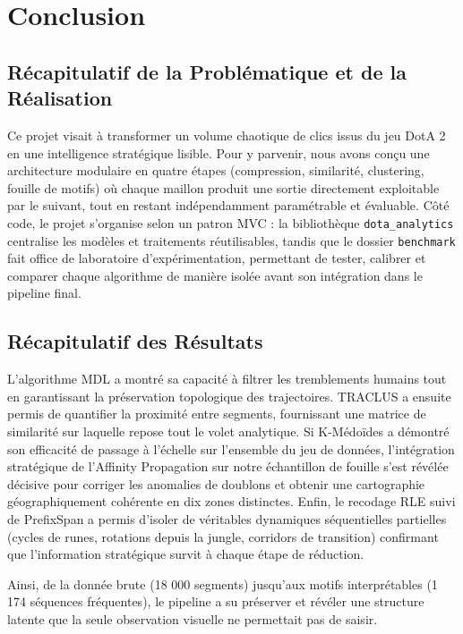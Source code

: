 \documentclass[11pt, a4paper]{article}
\begin{document}
\section{Conclusion}

\subsection{Récapitulatif de la Problématique et de la Réalisation}

Ce projet visait à transformer un volume chaotique de clics issus du jeu DotA 2 en une intelligence stratégique lisible. Pour y parvenir, nous avons conçu une architecture modulaire en quatre étapes (compression, similarité, clustering, fouille de motifs) où chaque maillon produit une sortie directement exploitable par le suivant, tout en restant indépendamment paramétrable et évaluable. Côté code, le projet s'organise selon un patron MVC : la bibliothèque \texttt{dota\_analytics} centralise les modèles et traitements réutilisables, tandis que le dossier \texttt{benchmark} fait office de laboratoire d'expérimentation, permettant de tester, calibrer et comparer chaque algorithme de manière isolée avant son intégration dans le pipeline final.

\subsection{Récapitulatif des Résultats}

L'algorithme MDL a montré sa capacité à filtrer les tremblements humains tout en garantissant la préservation topologique des trajectoires. TRACLUS a ensuite permis de quantifier la proximité entre segments, fournissant une matrice de similarité sur laquelle repose tout le volet analytique. Si K-Médoïdes a démontré son efficacité de passage à l'échelle sur l'ensemble du jeu de données, l'intégration stratégique de l'Affinity Propagation sur notre échantillon de fouille s'est révélée décisive pour corriger les anomalies de doublons et obtenir une cartographie géographiquement cohérente en dix zones distinctes. Enfin, le recodage RLE suivi de PrefixSpan a permis d'isoler de véritables dynamiques séquentielles partielles (cycles de runes, rotations depuis la jungle, corridors de transition) confirmant que l'information stratégique survit à chaque étape de réduction.

Ainsi, de la donnée brute (18 000 segments) jusqu'aux motifs interprétables (1 174 séquences fréquentes), le pipeline a su préserver et révéler une structure latente que la seule observation visuelle ne permettait pas de saisir.
\end{document}
